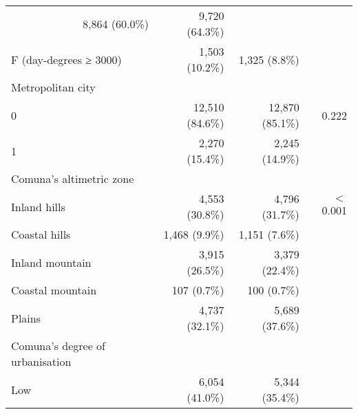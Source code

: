 \documentclass{article}
\begin{document}
\begin{table}[!h]
\begin{tabular}{llll}
  \multicolumn{1}{r}{8,864 (60.0\%)} &
  \multicolumn{1}{r}{9,720 (64.3\%)} &
  \multicolumn{1}{r}{} \\
\multicolumn{1}{l}{\hspace{1em}F (day-degrees ≥ 3000)} &
  \multicolumn{1}{r}{1,503 (10.2\%)} &
  \multicolumn{1}{r}{1,325 (8.8\%)} &
  \multicolumn{1}{r}{} \\
\multicolumn{1}{l}{Metropolitan city} &
  \multicolumn{1}{r}{} &
  \multicolumn{1}{r}{} &
  \multicolumn{1}{r}{} \\
\multicolumn{1}{l}{\hspace{1em}0} &
  \multicolumn{1}{r}{12,510 (84.6\%)} &
  \multicolumn{1}{r}{12,870 (85.1\%)} &
  \multicolumn{1}{r}{0.222} \\
\multicolumn{1}{l}{\hspace{1em}1} &
  \multicolumn{1}{r}{2,270 (15.4\%)} &
  \multicolumn{1}{r}{2,245 (14.9\%)} &
  \multicolumn{1}{r}{} \\
\multicolumn{1}{l}{Comuna's altimetric zone} &
  \multicolumn{1}{r}{} &
  \multicolumn{1}{r}{} &
  \multicolumn{1}{r}{} \\
\multicolumn{1}{l}{\hspace{1em}Inland hills} &
  \multicolumn{1}{r}{4,553 (30.8\%)} &
  \multicolumn{1}{r}{4,796 (31.7\%)} &
  \multicolumn{1}{r}{$<$0.001} \\
\multicolumn{1}{l}{\hspace{1em}Coastal hills} &
  \multicolumn{1}{r}{1,468 (9.9\%)} &
  \multicolumn{1}{r}{1,151 (7.6\%)} &
  \multicolumn{1}{r}{} \\
\multicolumn{1}{l}{\hspace{1em}Inland mountain} &
  \multicolumn{1}{r}{3,915 (26.5\%)} &
  \multicolumn{1}{r}{3,379 (22.4\%)} &
  \multicolumn{1}{r}{} \\
\multicolumn{1}{l}{\hspace{1em}Coastal mountain} &
  \multicolumn{1}{r}{107 (0.7\%)} &
  \multicolumn{1}{r}{100 (0.7\%)} &
  \multicolumn{1}{r}{} \\
\multicolumn{1}{l}{\hspace{1em}Plains} &
  \multicolumn{1}{r}{4,737 (32.1\%)} &
  \multicolumn{1}{r}{5,689 (37.6\%)} &
  \multicolumn{1}{r}{} \\
\multicolumn{1}{l}{Comuna's degree of urbanisation} &
  \multicolumn{1}{r}{} &
  \multicolumn{1}{r}{} &
  \multicolumn{1}{r}{} \\
\multicolumn{1}{l}{\hspace{1em}Low} &
  \multicolumn{1}{r}{6,054 (41.0\%)} &
  \multicolumn{1}{r}{5,344 (35.4\%)} &

\end{tabular}
\end{table}
\end{document}
